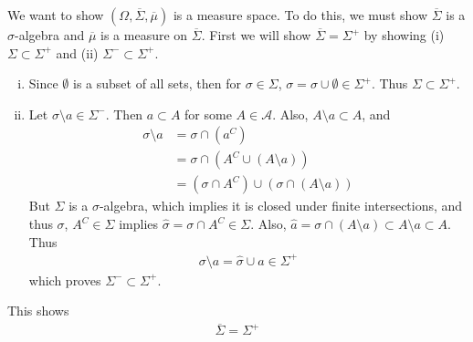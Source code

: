 \documentclass[12pt]{article}
\theoremstyle{plain}
\begin{document}
We want to show $(\Omega, \overline{\Sigma}, \overline{\mu})$ is a measure space.  To do this, we must show $\overline{\Sigma}$ is a $\sigma$-algebra and $\overline{\mu}$ is a measure on $\overline{\Sigma}$.  First we will show $\overline{\Sigma} = \Sigma^+$ by showing (i) $\Sigma \subset \Sigma^+$ and (ii) $\Sigma^- \subset \Sigma^+$.
\begin{enumerate}[(i)]
    \item
        Since $\emptyset$ is a subset of all sets, then for $\sigma \in\Sigma$, $\sigma = \sigma \cup \emptyset \in \Sigma^+$.  Thus $\Sigma \subset \Sigma^+$.
    \item
        Let $\sigma \setminus a \in \Sigma^-$.  Then $a \subset A$ for some $A \in \mathcal{A}$.  Also, $A \setminus a \subset A$, and
        \begin{align*}
            \sigma \setminus a &= \sigma \cap (a^C) \\
            &= \sigma \cap (A^C \cup (A \setminus a)) \\
            &= (\sigma \cap A^C) \cup (\sigma \cap (A \setminus a))
        \end{align*}
        But $\Sigma$ is a $\sigma$-algebra, which implies it is closed under finite intersections, and thus $\sigma$, $A^C \in \Sigma$ implies $\hat{\sigma} = \sigma \cap A^C \in \Sigma$.  Also, $\hat{a} = \sigma \cap (A \setminus a) \subset A \setminus a \subset A$.  Thus
        \begin{align*}
            \sigma \setminus a = \hat{\sigma} \cup \hat{a} \in \Sigma^+
        \end{align*}
        which proves $\Sigma^- \subset \Sigma^+$.
\end{enumerate}
This shows
\begin{align*}
    \overline{\Sigma} = \Sigma^+
\end{align*}
\end{document}
